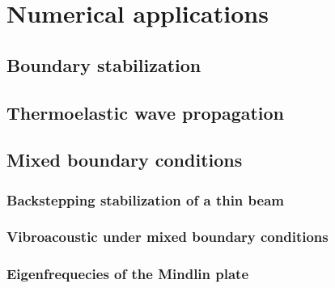 \chapter{Numerical applications}

\section{Boundary stabilization}

\section{Thermoelastic wave propagation}

\section{Mixed boundary conditions}

\subsection{Backstepping stabilization of a thin beam}

\subsection{Vibroacoustic under mixed boundary conditions}

\subsection{Eigenfrequecies of the Mindlin plate}